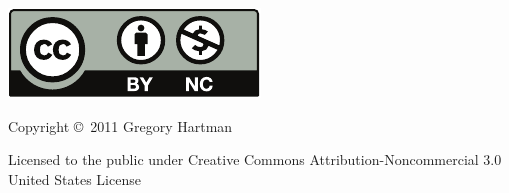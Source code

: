 \noindent\begin{minipage}{2in}
\includegraphics{text/by-nc} 
\end{minipage}
\begin{minipage}{3in}
\noindent Copyright \copyright\ 2011 Gregory Hartman

Licensed to the public under Creative Commons Attribution-Noncommercial 3.0 United States License
\end{minipage}

